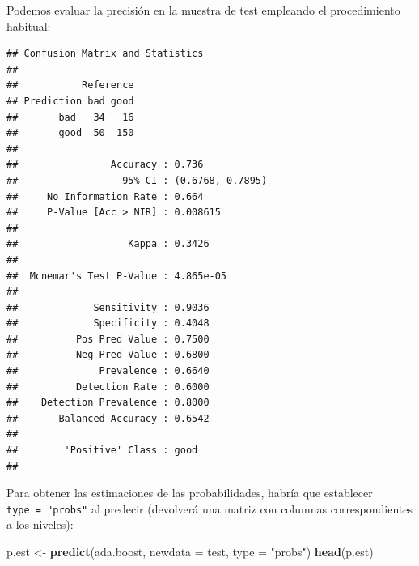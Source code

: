 \documentclass[
  spanish,
]{book}
\newenvironment{Shaded}{\begin{snugshade}}{\end{snugshade}}
\newcommand{\DataTypeTok}[1]{\textcolor[rgb]{0.13,0.29,0.53}{#1}}
\newcommand{\KeywordTok}[1]{\textcolor[rgb]{0.13,0.29,0.53}{\textbf{#1}}}
\newcommand{\NormalTok}[1]{#1}
\newcommand{\OperatorTok}[1]{\textcolor[rgb]{0.81,0.36,0.00}{\textbf{#1}}}
\newcommand{\StringTok}[1]{\textcolor[rgb]{0.31,0.60,0.02}{#1}}
\theoremstyle{break}
\theoremstyle{definition}
\theoremstyle{definition}
\theoremstyle{definition}
\theoremstyle{remark}
\begin{document}
Podemos evaluar la precisión en la muestra de test empleando el procedimiento habitual:

\begin{Shaded}
\end{Shaded}

\begin{verbatim}
## Confusion Matrix and Statistics
## 
##           Reference
## Prediction bad good
##       bad   34   16
##       good  50  150
##                                           
##                Accuracy : 0.736           
##                  95% CI : (0.6768, 0.7895)
##     No Information Rate : 0.664           
##     P-Value [Acc > NIR] : 0.008615        
##                                           
##                   Kappa : 0.3426          
##                                           
##  Mcnemar's Test P-Value : 4.865e-05       
##                                           
##             Sensitivity : 0.9036          
##             Specificity : 0.4048          
##          Pos Pred Value : 0.7500          
##          Neg Pred Value : 0.6800          
##              Prevalence : 0.6640          
##          Detection Rate : 0.6000          
##    Detection Prevalence : 0.8000          
##       Balanced Accuracy : 0.6542          
##                                           
##        'Positive' Class : good            
## 
\end{verbatim}

Para obtener las estimaciones de las probabilidades, habría que establecer \texttt{type\ =\ "probs"} al predecir (devolverá una matriz con columnas correspondientes a los niveles):

\begin{Shaded}
\begin{Highlighting}[]
\NormalTok{p.est <-}\StringTok{ }\KeywordTok{predict}\NormalTok{(ada.boost, }\DataTypeTok{newdata =}\NormalTok{ test, }\DataTypeTok{type =} \StringTok{"probs"}\NormalTok{)}
\KeywordTok{head}\NormalTok{(p.est)}
\end{Highlighting}
\end{Shaded}
\end{document}

